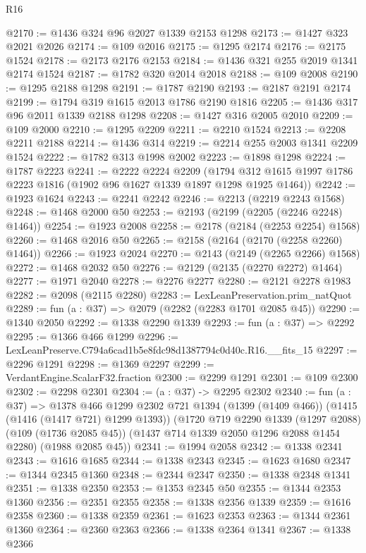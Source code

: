 \begin{lexlean}{R16}
\begin{coremodule}
@2170 := @1436 @324 @96 @2027 @1339 @2153 @1298
@2173 := @1427 @323 @2021 @2026
@2174 := @109 @2016
@2175 := @1295 @2174
@2176 := @2175 @1524
@2178 := @2173 @2176 @2153
@2184 := @1436 @321 @255 @2019 @1341 @2174 @1524
@2187 := @1782 @320 @2014 @2018
@2188 := @109 @2008
@2190 := @1295 @2188 @1298
@2191 := @1787 @2190
@2193 := @2187 @2191 @2174
@2199 := @1794 @319 @1615 @2013 @1786 @2190 @1816
@2205 := @1436 @317 @96 @2011 @1339 @2188 @1298
@2208 := @1427 @316 @2005 @2010
@2209 := @109 @2000
@2210 := @1295 @2209
@2211 := @2210 @1524
@2213 := @2208 @2211 @2188
@2214 := @1436 @314
@2219 := @2214 @255 @2003 @1341 @2209 @1524
@2222 := @1782 @313 @1998 @2002
@2223 := @1898 @1298
@2224 := @1787 @2223
@2241 := @2222
    @2224
    @2209
    (@1794 @312 @1615 @1997 @1786 @2223 @1816 (@1902 @96 @1627 @1339 @1897 @1298 @1925 @1464))
@2242 := @1923 @1624
@2243 := @2241 @2242
@2246 := @2213 (@2219 @2243 @1568)
@2248 := @1468 @2000 @50
@2253 := @2193 (@2199 (@2205 (@2246 @2248) @1464))
@2254 := @1923 @2008
@2258 := @2178 (@2184 (@2253 @2254) @1568)
@2260 := @1468 @2016 @50
@2265 := @2158 (@2164 (@2170 (@2258 @2260) @1464))
@2266 := @1923 @2024
@2270 := @2143 (@2149 (@2265 @2266) @1568)
@2272 := @1468 @2032 @50
@2276 := @2129 (@2135 (@2270 @2272) @1464)
@2277 := @1971 @2040
@2278 := @2276 @2277
@2280 := @2121 @2278 @1983
@2282 := @2098 (@2115 @2280)
@2283 := LexLeanPreservation.prim_natQuot
@2289 := fun (a : @37) => @2079 (@2282 (@2283 @1701 @2085 @45))
@2290 := @1340 @2050
@2292 := @1338 @2290 @1339
@2293 := fun (a : @37) => @2292
@2295 := @1366 @466 @1299
@2296 := LexLeanPreserve.C794a6cad1b5e8fdc98d1387794c0d40c.R16.__fits_15
@2297 := @2296 @1291
@2298 := @1369 @2297
@2299 := VerdantEngine.ScalarF32.fraction
@2300 := @2299 @1291
@2301 := @109 @2300
@2302 := @2298 @2301
@2304 := (a : @37) -> @2295 @2302
@2340 := fun (a : @37) =>
  @1378
    @466
    @1299
    @2302
    @721
    @1394
    (@1399 (@1409 @466))
    (@1415 (@1416 (@1417 @721) @1299 @1393))
    (@1720
      @719
      @2290
      @1339
      (@1297 @2088)
      (@109 (@1736 @2085 @45))
      (@1437 @714 @1339 @2050 @1296 @2088 @1454 @2280)
      (@1988 @2085 @45))
@2341 := @1994 @2058
@2342 := @1338 @2341
@2343 := @1616 @1685
@2344 := @1338 @2343
@2345 := @1623 @1680
@2347 := @1344 @2345 @1360
@2348 := @2344 @2347
@2350 := @1338 @2348 @1341
@2351 := @1338 @2350
@2353 := @1353 @2345 @50
@2355 := @1344 @2353 @1360
@2356 := @2351 @2355
@2358 := @1338 @2356 @1339
@2359 := @1616 @2358
@2360 := @1338 @2359
@2361 := @1623 @2353
@2363 := @1344 @2361 @1360
@2364 := @2360 @2363
@2366 := @1338 @2364 @1341
@2367 := @1338 @2366

\end{coremodule}
\end{lexlean}
